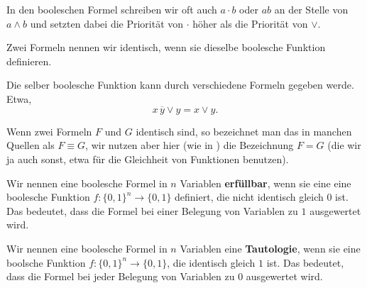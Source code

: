 \begin{bem}
In den booleschen Formel schreiben wir oft auch $a \cdot b$ oder $a b$ an der Stelle von $a \wedge b$ und setzten dabei die Priorität von $\cdot$ höher als die Priorität von $\vee$. 
\end{bem} 

\begin{defn}
Zwei Formeln nennen wir identisch, wenn sie dieselbe boolesche Funktion definieren. 
\end{defn} 

\begin{defn}
	Die selber boolesche Funktion kann durch verschiedene Formeln gegeben werde. Etwa, 
	\[
		x \, \overline{y}\vee y= x \vee y.  
	\]
\end{defn} 

\begin{bem}
	Wenn zwei Formeln $F$ und $G$ identisch sind, so bezeichnet man das in manchen Quellen als $F \equiv G$, wir nutzen aber hier (wie in \cite{Lov20}) die Bezeichnung $F = G$ (die wir ja auch sonst, etwa für die  Gleichheit von Funktionen benutzen). 
\end{bem} 

\begin{defn} 
Wir nennen eine boolesche Formel in $n$ Variablen \textbf{erfüllbar}, wenn sie eine eine boolesche Funktion $f  : \{0,1\}^n \to \{0,1\}$ definiert, die nicht identisch gleich $0$ ist. Das bedeutet, dass die Formel bei einer Belegung von Variablen zu $1$ ausgewertet wird. 
\end{defn} 

\begin{defn} 
Wir nennen eine boolesche Formel in $n$ Variablen eine \textbf{Tautologie}, wenn sie eine boolsche Funktion $f: \{0,1\}^n \to \{0,1\}$, die identisch gleich $1$ ist. Das bedeutet, dass die Formel bei jeder Belegung von Variablen zu $0$ ausgewertet wird. 
\end{defn} 


